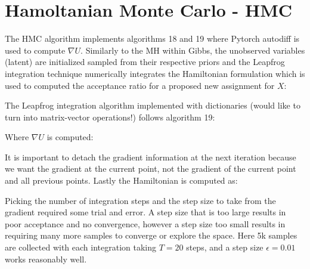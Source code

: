 \documentclass[]{article}
\begin{document}
\section{Hamoltanian Monte Carlo - HMC}
The HMC algorithm implements algorithms 18 and 19 where Pytorch autodiff is used to compute $\nabla U$. Similarly to the MH within Gibbs, the unobserved variables (latent) are initialized sampled from their respective priors and the Leapfrog integration technique numerically integrates the Hamiltonian formulation which is used to computed the acceptance ratio for a proposed new assignment for $X$:

The Leapfrog integration algorithm implemented with dictionaries (would like to turn into matrix-vector operations!) follows algorithm 19:

Where $\nabla U$ is computed:

It is important to detach the gradient information at the next iteration because we want the gradient at the current point, not the gradient of the current point and all previous points. Lastly the Hamiltonian is computed as:


Picking the number of integration steps and the step size to take from the gradient required some trial and error. A step size that is too large results in poor acceptance and no convergence, however a step size too small results in requiring many more samples to converge or explore the space. Here 5k samples are collected with each integration taking $T=20$ steps, and a step size $\epsilon = 0.01$ works reasonably well.
\end{document}
